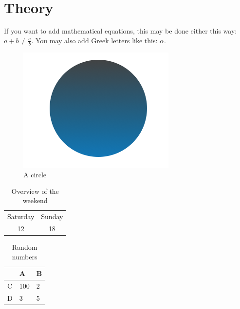 \section{Theory}

If you want to add mathematical equations, this may be done either this way: $a +
b \neq \frac{a}{b}$. You may also add Greek letters like this: $\alpha$.\\

\blindtext %

\begin{figure}[htpb!] %
	\centering %
	\includegraphics[scale=0.8]{
		figure/figure.png
	} %
	\caption{A circle} %
	\label{fig:my_label} %
\end{figure}

\blindtext %

\begin{table}[] %
	\centering
	\begin{tabular}{c|c}
		Saturday & Sunday \\
		12       & 18
	\end{tabular}
	\caption{Overview of the weekend}%
	\label{tab:weekend} %
\end{table}

\begin{table}[] %
	\centering
	\begin{tabular}{@{}lll@{}}
		\toprule   & A   & B \\
		\midrule C & 100 & 2 \\
		D          & 3   & 5 \\
		\bottomrule
	\end{tabular}
	\caption{Random numbers} %
	\label{tab:numbers} %
\end{table}